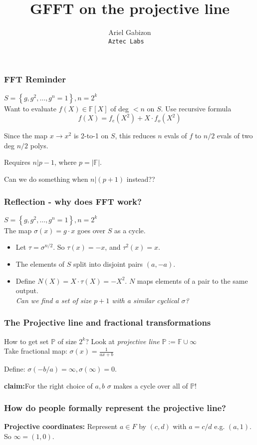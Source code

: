 \documentclass[shadesubsections,compress,14pt,mathserif]{beamer}
\title{\large{GFFT on the projective line}}    %
\author{\small{Ariel Gabizon}\\                 %
\tt{\footnotesize{Aztec Labs}                                       } }      %
\date{}                    %
\newcommand{\F}{\ensuremath{{\mathbb F}}}
\renewcommand{\P}{\ensuremath{{\mathbb P}}}
\newcommand{\set}[1]{\ensuremath{\left\{#1\right\}}}
\newcommand{\defeq}{\ensuremath{:=}}
\newcommand{\nl}{\\ \pause \vspace{0.2in}}
\newcommand{\nlnp}{\\ \vspace{0.2in}}
\begin{document}
\boldmath
\begin{frame}
  \titlepage
\end{frame}


\begin{frame}
 \frametitle{FFT Reminder}
 
 
 
 $S=\set{g,g^2,\ldots,g^{n}=1},n=2^k$\nl
 Want to evaluate $f(X)\in \F[X]$ of deg $<n$ on $S$.\pause
 Use recursive formula
 \[f(X)=f_e(X^2)+X\cdot f_o(X^2)\]
 
 Since the map $x\to x^2$ is 2-to-1 on $S$, this reduces $n$ evals of $f$ to $n/2$ evals of two deg $n/2$ polys.\nl

 
 Requires $n|p-1$, where $p=|\F|$.
 
 Can we do something when  $n|(p+1)$ instead?? 
 
\end{frame}
\begin{frame}
 \frametitle{Reflection - why does FFT work?}
 $S=\set{g,g^2,\ldots,g^{n}=1},n=2^k$\nl
The map $\sigma(x)=g\cdot x$ goes over $S$ as a cycle.\nl
\begin{itemize}
\item Let $\tau = \sigma^{n/2}$. So $\tau(x)=-x$, and $\tau^2(x)=x$.
\item The elements of $S$ split into disjoint pairs $(a,-a)$.\pause
\item Define $N(X)=X \cdot \tau(X)=-X^2$. $N$ maps elements of a pair to the same output.\nl  
\textit{Can we find a set of size $p+1$ with a similar cyclical $\sigma$?}
\end{itemize}

\end{frame}
\begin{frame}
 \frametitle{The Projective line and fractional transformations}
 
 How to get set $\P$ of size $2^k$?
 Look at \emph{projective line} $\P\defeq \F\cup\infty$\nl
 Take fractional map:
 $\sigma(x)= \frac{1}{ax+b}$
 
 Define: $\sigma(-b/a)=\infty,\sigma(\infty)=0$.\nl
 
 \textbf{claim:}For the right choice of $a,b$ $\sigma$ makes a cycle over all of \P!
 
 
 
\end{frame}
\begin{frame}
 \frametitle{How do people formally represent the projective line?}
 \textbf{Projective coordinates:}
 Represent $a\in F$ by  $(c,d)$ with $a=c/d$ e.g. $(a,1)$.\nlnp
 So $\infty=(1,0)$.\nl
 

\end{frame}
\end{document}
